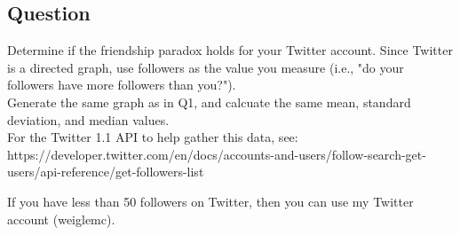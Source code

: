 \documentclass[letterpaper,12pt]{article}
\begin{document}
\subsection{Question}
\vspace*{10pt}
Determine if the friendship paradox holds for your Twitter account. Since Twitter is a directed graph, use followers as the value you measure (i.e., "do your followers have more followers than you?").\\

Generate the same graph as in Q1, and calcuate the same mean, standard deviation, and median values.\\

For the Twitter 1.1 API to help gather this data, see:\\

https://developer.twitter.com/en/docs/accounts-and-users/follow-search-get-users/api-reference/get-followers-list

If you have less than 50 followers on Twitter, then you can use my Twitter account (weiglemc).\\
\end{document}
